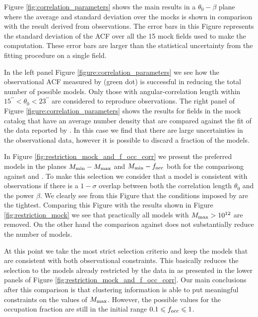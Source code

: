 \documentclass[usenatbib]{mn2e}
\begin{document}
Figure \ref{fig:correlation_parameters} shows the main results in a
$\theta_{0}-\beta$  plane where the average and standard deviation
over the mocks is shown in comparison with the result derived from
observations.  The error bars in this Figure represents the standard
deviation of the ACF over all the 15 mock fields used to make the
computation.  These error bars are larger than the statistical
uncertainty from the fitting procedure on a single field. 

In the left panel Figure \ref{figure:correlation_parameters} we see
how the observational ACF measured by \cite{Hayashino2004} (green dot)
is successful in reducing the total number of possible models. Only
those with angular-correlation length within
$15^{\prime\prime}<\theta_{0}<23^{\prime\prime}$ are considered to
reproduce observations. The right panel of Figure
\ref{figure:correlation_parameters} shows the results for fields in
the mock catalog that have an average number density that are compared
against the fit of the data reported by \cite{Ouchi2010}. In this case
we find that there are large uncertainties in the observational data,
however it is possible to discard a fraction of the models.


In Figure \ref{fig:restriction_mock_and_f_occ_corr} we present the preferred
models in the planes $M_{\rm min}-M_{\rm  max}$ and $M_{\rm min}-f_{\rm occ}$
both for the comparisong against \cite{Hayashino2004} and
\cite{Ouchi2010}. To make this selection we consider that
a model is consistent with observations if there is a $1-\sigma$
overlap between both the correlation length $\theta_0$ and the power
$\beta$. We clearly see from this Figure that the conditions imposed
by \cite{Hayashino2004} are the tightest. Comparing this Figure with
the results shown in Figure \ref{fig:restriction_mock} we see that
practically all models with $M_{\rm max}>10^{12}$ are removed. On the
other hand the comparison against \cite{Ouchi2010} does not
substantially reduce the number of models. 

At this point we take the most strict selection criterio and keep the
models that are consistent with both observational constraints. This
basically reduces the selection to the models already restricted by
the data in \cite{Hayashino2004} as presented in the lower panels of Figure
\ref{fig:restriction_mock_and_f_occ_corr}. Our main conclusions after
this comparison is that clustering information is able to put
meaningful constraints on the values of $M_{\rm max}$. However, the
possible values for the occupation fraction are still in the initial
range $0.1\leq f_{\rm occ}\leq 1$.
\end{document}
